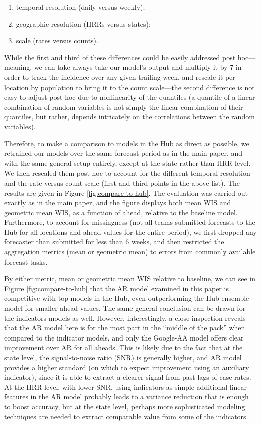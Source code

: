 \begin{enumerate}
\item temporal resolution (daily versus weekly);
\item geographic resolution (HRRs versus states); 
\item scale (rates versus counts).
\end{enumerate}

While the first and third of these differences could be easily addressed post 
hoc---meaning, we can take always take our model's output and multiply it by 
7 in order to track the incidence over any given trailing week, and rescale it
per location by population to bring it to the count scale---the second
difference is not easy to adjust post hoc due to nonlinearity of the quantiles
(a quantile of a linear combination of random variables is not simply the linear
combination of their quantiles, but rather, depends intricately on the
correlations between the random variables).    

Therefore, to make a comparison to models in the Hub as direct as possible, we
retrained our models over the same forecast period as in the main paper, and
with the same general setup entirely, except at the state rather than HRR level.
We then rescaled them post hoc to account for the different temporal resolution
and the rate versus count scale (first and third points in the above list).  The
results are given in Figure \ref{fig:compare-to-hub}.  The evaluation was
carried out exactly as in the main paper, and the figure displays both mean WIS
and geometric mean WIS, as a function of ahead, relative to the baseline model.
Furthermore, to account for missingness (not all teams submitted forecasts to
the Hub for all locations and ahead values for the entire period), we first
dropped any forecaster than submitted for less than 6 weeks, and then restricted
the aggregation metrics (mean or geometric mean) to errors from commonly
available forecast tasks.

By either metric, mean or geometric mean WIS relative to baseline, we can see  
in Figure \ref{fig:compare-to-hub} that the AR model examined in this paper is 
competitive with top models in the Hub, even outperforming the Hub ensemble
model for smaller ahead values.  The same general conclusion can be drawn for
the indicators models as well.  However, interestingly, a close inspection
reveals that the AR model here is for the most part in the ``middle of the
pack'' when compared to the indicator models, and only the Google-AA model
offers clear improvement over AR for all aheads.  This is likely due to the fact
that at the state level, the signal-to-noise ratio (SNR) is generally higher,
and AR model provides a higher standard (on which to expect improvement using an 
auxiliary indicator), since it is able to extract a clearer signal from past
lags of case rates.  At the HRR level, with lower SNR, using indicators as
simple additional linear features in the AR model probably leads to a variance
reduction that is enough to boost accuracy, but at the state level, perhaps more
sophisticated modeling techniques are needed to extract comparable value from
some of the indicators.

